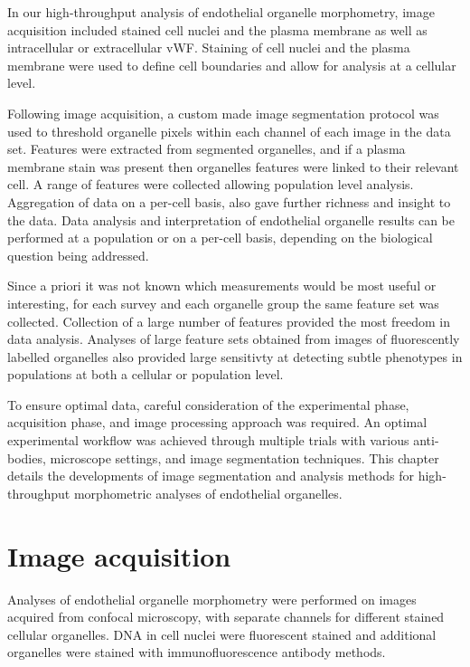 In our high-throughput analysis of endothelial organelle morphometry, image acquisition included stained cell nuclei and the plasma membrane as well as intracellular or extracellular vWF. Staining of cell nuclei and the plasma membrane were used to define cell boundaries and allow for analysis at a cellular level.

Following image acquisition, a custom made image segmentation protocol was used to threshold organelle pixels within each channel of each image in the data set. Features were extracted from segmented organelles, and if a plasma membrane stain was present then organelles features were linked to their relevant cell. A range of features were collected allowing population level analysis. Aggregation of data on a per-cell basis, also gave further richness and insight to the data. Data analysis and interpretation of endothelial organelle results can be performed at a population or on a per-cell basis, depending on the biological question being addressed.

Since a priori it was not known which measurements would be most useful or interesting, for each survey and each organelle group the same feature set was collected. Collection of a large number of features provided the most freedom in data analysis. Analyses of large feature sets obtained from images of fluorescently labelled organelles also provided large sensitivty at detecting subtle phenotypes in populations at both a cellular or population level.

To ensure optimal data, careful consideration of the experimental phase, acquisition phase, and image processing approach was required. An optimal experimental workflow was achieved through multiple trials with various anti-bodies, microscope settings, and image segmentation techniques. This chapter details the developments of image segmentation and analysis methods for high-throughput morphometric analyses of endothelial organelles.

\section{Image acquisition}
\label{endothelial_morphometry:image_acquisition}
Analyses of endothelial organelle morphometry were performed on images acquired from confocal microscopy, with separate channels for different stained cellular organelles. DNA in cell nuclei were fluorescent stained and additional organelles were stained with immunofluorescence antibody methods.

